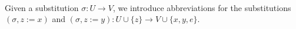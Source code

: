 \begin{code}%
\> \AgdaSymbol{:}  \AgdaSymbol{\{}\AgdaSymbol{\}}        \AgdaSymbol{(} \AgdaInductiveConstructor{,}  \AgdaInductiveConstructor{,}  \AgdaInductiveConstructor{,} \AgdaSymbol{)}\<%
\\
\>   \AgdaSymbol{=}             \<%
\end{code}

Given a substitution $\sigma : U \rightarrow V$, we introduce abbreviations for the substitutions $(\sigma, z := x)$ and $(\sigma , z := y) : U \cup \{ z \} \rightarrow V \cup \{ x , y , e \}$.

